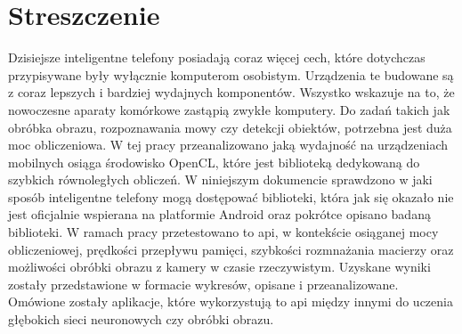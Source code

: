 \section*{Streszczenie}
Dzisiejsze inteligentne telefony posiadają coraz więcej cech, które dotychczas przypisywane były wyłącznie komputerom osobistym. Urządzenia te budowane są z coraz lepszych i bardziej wydajnych komponentów. Wszystko wskazuje na to, że nowoczesne aparaty komórkowe zastąpią zwykłe komputery. Do zadań takich jak obróbka obrazu, rozpoznawania mowy czy detekcji obiektów, potrzebna jest duża moc obliczeniowa. W tej pracy przeanalizowano jaką wydajność na urządzeniach mobilnych osiąga środowisko OpenCL, które jest biblioteką dedykowaną do szybkich równoległych obliczeń. W niniejszym dokumencie sprawdzono w jaki sposób inteligentne telefony mogą dostępować biblioteki, która jak się okazało nie jest oficjalnie wspierana na platformie Android oraz pokrótce opisano badaną biblioteki. W ramach pracy przetestowano to api, w kontekście osiąganej mocy obliczeniowej, prędkości przepływu pamięci, szybkości rozmnażania macierzy oraz możliwości obróbki obrazu z kamery w czasie rzeczywistym. Uzyskane wyniki zostały przedstawione w formacie wykresów, opisane i przeanalizowane. Omówione zostały aplikacje, które wykorzystują to api między innymi do uczenia głębokich sieci neuronowych czy obróbki obrazu. 
